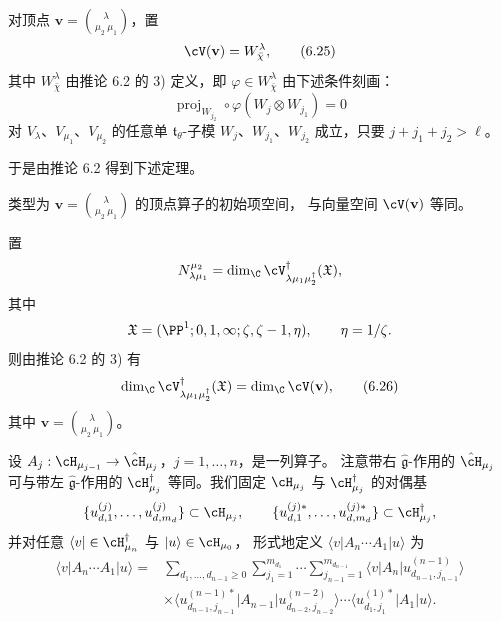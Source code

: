 \begin{definition}[6.14]
对顶点 $\mathbf{v}=\binom{\lambda}{\mu_2\ \mu_1}$，置
\begin{equation}
\cV(\mathbf{v})=W^{\lambda}_{\bar{\chi}}, \tag{6.25}
\end{equation}
其中 $W^{\lambda}_{\bar{\chi}}$ 由推论 6.2 的 3) 定义，即
$\varphi\in W^{\lambda}_{\bar{\chi}}$ 由下述条件刻画：
\[
\operatorname{proj}_{W_{j_2}}\circ\varphi(W_j\otimes W_{j_1})=0
\]
对 $V_\lambda$、$V_{\mu_1}$、$V_{\mu_2}$ 的任意单 $\mathfrak{t}_\theta$-子模
$W_j$、$W_{j_1}$、$W_{j_2}$ 成立，只要 $j+j_1+j_2>\ell$。
\end{definition}




于是由推论 6.2 得到下述定理。

\begin{theorem}[6.15]
类型为 $\mathbf{v}=\binom{\lambda}{\mu_2\ \mu_1}$ 的顶点算子的初始项空间，
与向量空间 $\cV(\mathbf{v})$ 等同。
\end{theorem}

置
\[
N^{\mu_2}_{\lambda\mu_1}=\dim_\C\cV^{\dagger}_{\lambda\mu_1\mu_2^{\dagger}}
(\mathfrak{X}),
\]
其中
\[
\mathfrak{X}=(\PP^1;0,1,\infty;\zeta,\zeta-1,\eta),\qquad \eta=1/\zeta .
\]
则由推论 6.2 的 3) 有
\begin{equation}
\dim_\C\cV^{\dagger}_{\lambda\mu_1\mu_2^{\dagger}}(\mathfrak{X})
=\dim_\C\cV(\mathbf{v}), \tag{6.26}
\end{equation}
其中 $\mathbf{v}=\binom{\lambda}{\mu_2\ \mu_1}$。

设 $A_j:\cH_{\mu_{j-1}}\to\hat{\cH}_{\mu_j}$，$j=1,\dots,n$，是一列算子。
注意带右 $\hat{\mathfrak{g}}$-作用的 $\hat{\cH}_{\mu_j}$ 可与带左
$\hat{\mathfrak{g}}$-作用的 $\cH^{\dagger}_{\mu_j}$ 等同。我们固定
$\cH_{\mu_j}$ 与 $\cH^{\dagger}_{\mu_j}$ 的对偶基
\[
\{u^{(j)}_{d,1},\dots,u^{(j)}_{d,m_d}\}\subset\cH_{\mu_j},\qquad
\{u^{(j)*}_{d,1},\dots,u^{(j)*}_{d,m_d}\}\subset\cH^{\dagger}_{\mu_j},
\]
并对任意 $\langle v|\in\cH^{\dagger}_{\mu_n}$ 与 $|u\rangle\in\cH_{\mu_0}$，
形式地定义 $\langle v|A_n\cdots A_1|u\rangle$ 为
\[
\begin{aligned}
\langle v|A_n\cdots A_1|u\rangle
={}&\sum_{d_1,\dots,d_{n-1}\ge0}\sum_{j_1=1}^{m_{d_1}}\cdots
 \sum_{j_{n-1}=1}^{m_{d_{n-1}}}
 \langle v|A_n|u^{(n-1)}_{d_{n-1},j_{n-1}}\rangle\\
&\times\langle u^{(n-1)*}_{d_{n-1},j_{n-1}}|A_{n-1}
 |u^{(n-2)}_{d_{n-2},j_{n-2}}\rangle\cdots
 \langle u^{(1)*}_{d_1,j_1}|A_1|u\rangle .
\end{aligned}
\]

